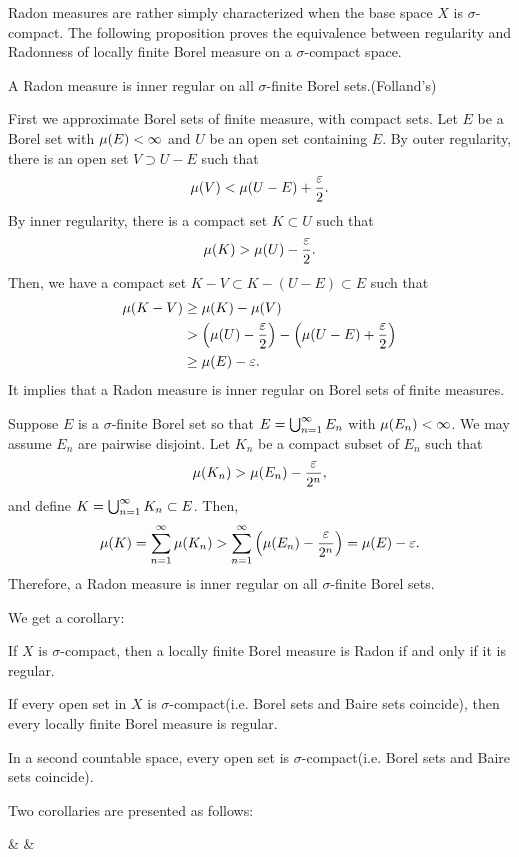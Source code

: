 \documentclass{../crs}
\begin{document}
Radon measures are rather simply characterized when the base space $X$ is $\sigma$-compact.
The following proposition proves the equivalence between regularity and Radonness of locally finite Borel measure on a $\sigma$-compact space.
\begin{prop}
A Radon measure is inner regular on all $\sigma$-finite Borel sets.(Folland's)
\end{prop}
\begin{pf}
First we approximate Borel sets of finite measure, with compact sets.
Let $E$ be a Borel set with $\mu(E)<\infty$ and $U$ be an open set containing $E$.
By outer regularity, there is an open set $V\supset U-E$ such that
\[\mu(V)<\mu(U-E)+\frac{\varepsilon}2.\]
By inner regularity, there is a compact set $K\subset U$ such that
\[\mu(K)>\mu(U)-\frac{\varepsilon}2.\]
Then, we have a compact set $K-V\subset K-(U-E)\subset E$ such that
\begin{align*}
\mu(K-V)&\ge\mu(K)-\mu(V)\\
&>\left(\mu(U)-\frac{\varepsilon}2\right)-\left(\mu(U-E)+\frac{\varepsilon}2\right)\\
&\ge\mu(E)-\varepsilon.
\end{align*}
It implies that a Radon measure is inner regular on Borel sets of finite measures.

Suppose $E$ is a $\sigma$-finite Borel set so that $E=\bigcup_{n=1}^\infty E_n$ with $\mu(E_n)<\infty$.
We may assume $E_n$ are pairwise disjoint.
Let $K_n$ be a compact subset of $E_n$ such that
\[\mu(K_n)>\mu(E_n)-\frac{\varepsilon}{2^n},\]
and define $K=\bigcup_{n=1}^\infty K_n\subset E$.
Then,
\[\mu(K)=\sum_{n=1}^\infty\mu(K_n)>\sum_{n=1}^\infty\left(\mu(E_n)-\frac{\varepsilon}{2^n}\right)=\mu(E)-\varepsilon.\]
Therefore, a Radon measure is inner regular on all $\sigma$-finite Borel sets.
\end{pf}
We get a corollary:
\begin{cor}
If $X$ is $\sigma$-compact, then a locally finite Borel measure is Radon if and only if it is regular.
\end{cor}

\begin{thm}
If every open set in $X$ is $\sigma$-compact(i.e. Borel sets and Baire sets coincide), then every locally finite Borel measure is regular.
\end{thm}
\begin{prop}
In a second countable space, every open set is $\sigma$-compact(i.e. Borel sets and Baire sets coincide).
\end{prop}


Two corollaries are presented as follows:
\begin{rd}[column sep={120pt,between origins}]
  &
     &
  
\end{rd}
\end{document}
